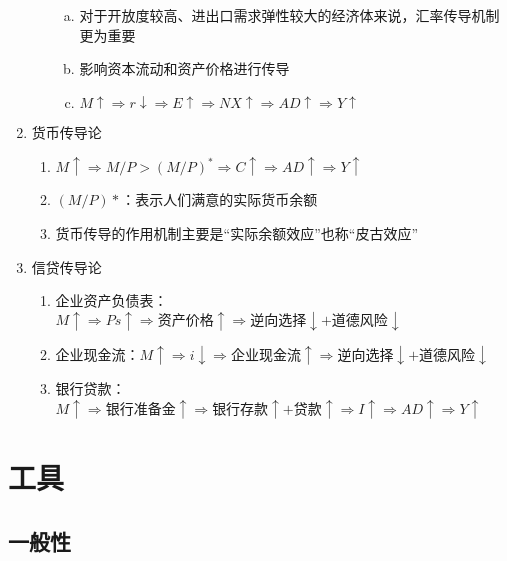 \documentclass[12pt]{book}
\begin{document}
\begin{enumerate}[1.]
\begin{enumerate}[(1)]
\begin{enumerate}[a.]
                  \item 对于开放度较高、进出口需求弹性较大的经济体来说，汇率传导机制更为重要
                  \item 影响资本流动和资产价格进行传导
                  \item $M\uparrow\Rightarrow r\downarrow \Rightarrow E\uparrow \Rightarrow NX\uparrow \Rightarrow AD\uparrow\Rightarrow Y\uparrow $
                \end{enumerate}
        \end{enumerate}
  \item 货币传导论	
        \begin{enumerate}[(1)]
          \item $ M\uparrow \Rightarrow M/P>(M/P)^*\Rightarrow C\uparrow \Rightarrow AD\uparrow\Rightarrow Y\uparrow $
          \item $(M/P)*$：表示人们满意的实际货币余额
          \item 货币传导的作用机制主要是“实际余额效应”也称“皮古效应”
        \end{enumerate}
  \item 信贷传导论
        \begin{enumerate}[(1)]
          \item 企业资产负债表：$M\uparrow \Rightarrow Ps\uparrow \Rightarrow \text{资产价格}\uparrow \Rightarrow \text{逆向选择}\downarrow +\text{道德风险}\downarrow $
          \item 企业现金流：$M\uparrow \Rightarrow i\downarrow \Rightarrow \text{企业现金流}\uparrow\Rightarrow \text{逆向选择}\downarrow +\text{道德风险}\downarrow $
          \item 银行贷款：$M\uparrow \Rightarrow \text{银行准备金}\uparrow \Rightarrow \text{银行存款}\uparrow +\text{贷款}\uparrow \Rightarrow I\uparrow \Rightarrow AD\uparrow\Rightarrow Y\uparrow$
        \end{enumerate}
\end{enumerate}













\section{工具}

\subsection{一般性}
\end{document}
